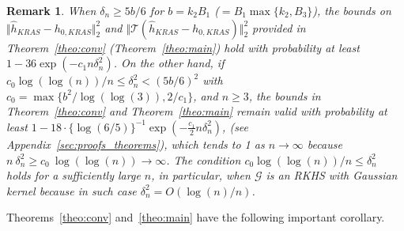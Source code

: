 \documentclass[twoside,11pt]{article}
\newtheorem{remark}{Remark}
\newcommand{\mc}{\mathcal}
\begin{document}
\begin{remark}
When $\delta_n\ge 5b/6$ for $b=k_2B_1$ ($=B_1\max\{k_2,B_3\}$), the bounds on $\Vert \hat {h}_{KRAS}-h_{0,KRAS}\Vert_2^2$ and $\Vert \mc{T}(\hat {h}_{KRAS}-h_{0,KRAS})\Vert_2^2$ provided in Theorem~\ref{theo:conv} (Theorem~\ref{theo:main}) hold with probability at least $1-36\exp\left(-c_1n\delta_n^2\right)$. On the other hand, if $ c_0\log(\log(n))/n\le \delta_n^2<\left(5b/6\right)^2$ with $c_0=\max\{b^2/\log(\log(3)),2/c_1\}$, and $n\ge 3$, the bounds in Theorem~\ref{theo:conv} and Theorem~\ref{theo:main} remain valid with probability at least $1-18\cdot \{\log(6/5)\}^{-1}\exp\left(-\frac{c_1}{2}n\delta_n^2\right)$, (see Appendix~\ref{sec:proofs_theorems}), which tends to 1 as $n \rightarrow \infty$ because $n \:\delta_n^2 \ge c_0 \:\log(\log(n))\rightarrow\infty$. The condition $c_0\log(\log(n))/n\le \delta_n^2$ holds for a sufficiently large $n$, in particular, when $\mc{G}$ is an RKHS with Gaussian kernel because in such case $\delta_n^2 = O(\log(n)/n)$.
\end{remark}
Theorems~\ref{theo:conv} and~\ref{theo:main} have the following important corollary. 
\end{document}
